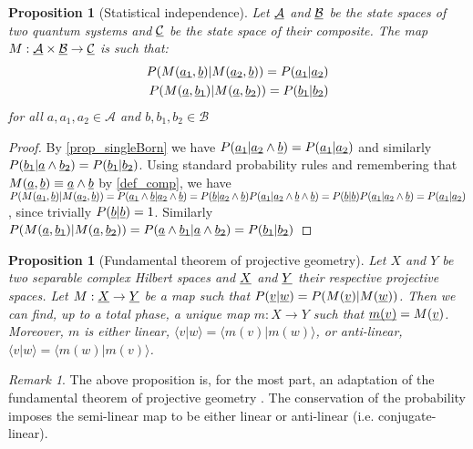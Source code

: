 \documentclass[aps,prl,amsmath,amssymb,twocolumn,nofootinbib]{revtex4}
\theoremstyle{plain}
\newtheorem{prop}[thrm]{Proposition}
\theoremstyle{definition}
\theoremstyle{remark}
\newtheorem*{remark}{Remark}
\newcommand{\pj}[1] {\underbar{$#1$}}
\def\>{\rangle}
\def\<{\langle}
\begin{document}
	\begin{prop}[Statistical independence]\label{prop_statInd}
		Let $\pj{\mathcal{A}}$ and $\pj{\mathcal{B}}$ be the state spaces of two quantum systems and $\pj{\mathcal{C}}$ be the state space of their composite. The map $M : \pj{\mathcal{A}} \times \pj{\mathcal{B}} \to \pj{\mathcal{C}}$ is such that:
		\begin{align}
		P(M(\pj{a_1},\pj{b}) | M(\pj{a_2},\pj{b})) = P(\pj{a_1} | \pj{a_2})  \\ P(M(\pj{a},\pj{b_1}) | M(\pj{a},\pj{b_2})) = P(\pj{b_1} | \pj{b_2})
		\end{align}
		for all $a, a_1, a_2 \in \mathcal{A}$ and $b, b_1, b_2 \in \mathcal{B}$
	\end{prop}
	\begin{proof}
		By \ref{prop_singleBorn} we have $P(\pj{a_1} | \pj{a_2} \wedge \pj{b}) = P(\pj{a_1} | \pj{a_2})$ and similarly $P(\pj{b_1} | \pj{a} \wedge \pj{b_2}) = P(\pj{b_1} | \pj{b_2})$.  Using standard probability rules and remembering that $M(\pj{a},\pj{b})\equiv \pj{a} \wedge \pj{b}$ by \ref{def_comp}, we have $P(M(\pj{a_1},\pj{b}) | M(\pj{a_2},\pj{b})) = P(\pj{a_1} \wedge \pj{b} | \pj{a_2} \wedge \pj{b})  = P(\pj{b} | \pj{a_2} \wedge \pj{b}) P(\pj{a_1} | \pj{a_2} \wedge \pj{b} \wedge \pj{b})  = P(\pj{b} | \pj{b}) P(\pj{a_1} | \pj{a_2} \wedge \pj{b}) = P(\pj{a_1} | \pj{a_2})$, since trivially $P(\pj{b}|\pj{b})=1$. Similarly $P(M(\pj{a},\pj{b_1}) | M(\pj{a},\pj{b_2})) =P(\pj{a} \wedge \pj{b_1} | \pj{a} \wedge \pj{b_2}) = P(\pj{b_1} | \pj{b_2})$
	\end{proof}
	
	\begin{prop}[Fundamental theorem of projective geometry]\label{prop_fundProj}
		Let $X$ and $Y$ be two separable complex Hilbert spaces and $\pj{X}$ and $\pj{Y}$ their respective projective spaces. Let $M : \pj{X} \to \pj{Y}$ be a map such that $P(\pj{v}|\pj{w}) = P(M(\pj{v})|M(\pj{w}))$. Then we can find, up to a total phase, a unique map $m : X \to Y$ such that $\pj{m(v)}=M(\pj{v})$. Moreover, $m$ is either linear, $\<v|w\> = \<m(v)|m(w)\>$, or anti-linear, $\<v|w\> = \<m(w)|m(v)\>$.
	\end{prop}
	
	\begin{remark}
		The above proposition is, for the most part, an adaptation of the fundamental theorem of projective geometry \cite{fun}. The conservation of the probability imposes the semi-linear map to be either linear or anti-linear (i.e. conjugate-linear).
	\end{remark}
	
\end{document}

